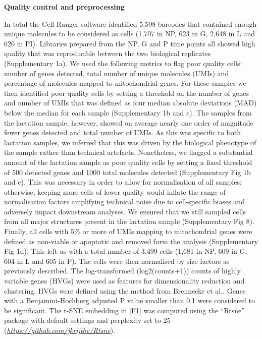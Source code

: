 \documentclass[titlepage, 12pt, oneside]{amsart}
\begin{document}
\textbf{Quality control and preprocessing}

In total the Cell Ranger software identified 5,598 barcodes that contained enough unique molecules to be considered as cells (1,707 in NP, 623 in G, 2,648 in L and 620 in PI).
Libraries prepared from the NP, G and P time points all showed high quality that was reproducible between the two biological replicates (Supplementary 1a).
We used the following metrics to flag poor quality cells: number of genes detected, total number of unique molecules (UMIs) and percentage of molecules mapped to mitochondrial genes.
For these samples we then identified poor quality cells by setting a threshold on the number of genes and number of UMIs that was defined as four median absolute deviations (MAD) below the median for each sample (Supplementary 1b and c).
The samples from the lactation sample, however, showed on average nearly one order of magnitude fewer genes detected and total number of UMIs.
As this was specific to both lactation samples, we inferred that this was driven by the biological phenotype of the sample rather than technical artefacts.
Nonetheless, we flagged a substantial amount of the lactation sample as poor quality cells by setting a fixed threshold of 500 detected genes and 1000 total molecules detected (Supplementary Fig 1b and c).
This was necessary in order to allow for normalisation of all samples; otherwise, keeping more cells of lower quality would inflate the range of normalisation factors amplifying technical noise due to cell-specific biases and adversely impact downstream analyses.
We ensured that we still sampled cells from all major structures present in the lactation sample (Supplementary Fig 8).
Finally, all cells with 5\% or more of UMIs mapping to mitochondrial genes were defined as non-viable or apoptotic and removed form the analysis (Supplementary Fig 1d).
This left us with a total number of 3,499 cells (1,681 in NP, 609 in G, 604 in L and 605 in P).
The cells were then normalised by size factors as previously described\autocite{Lun2016}.
The log-transformed (log2(counts+1)) counts of highly variable genes (HVGs) were used as features for dimensionality reduction and clustering.
HVGs were defined using the method from Brennecke et al.\autocite{Brennecke2013}.
Genes with a Benjamini-Hochberg adjusted P value smaller than 0.1 were considered to be significant.
The t-SNE embedding in \autoref{F1} was computed using the ``Rtsne'' package with default settings and perplexity set to 25 (\href{https://github.com/jkrijthe/Rtsne}{\textit{https://github.com/jkrijthe/Rtsne}}).
\end{document}
